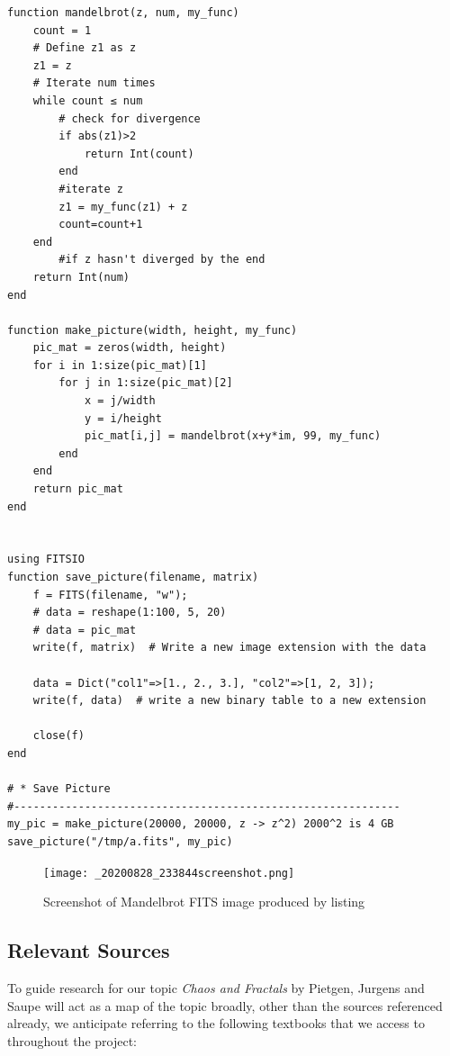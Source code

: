 \documentclass[11pt]{article}
\begin{document}
\lstset{language=julia,label,caption= ,captionpos=b,numbers=none}
\begin{lstlisting}
function mandelbrot(z, num, my_func)
    count = 1
    # Define z1 as z
    z1 = z
    # Iterate num times
    while count ≤ num
        # check for divergence
        if abs(z1)>2
            return Int(count)
        end
        #iterate z
        z1 = my_func(z1) + z
        count=count+1
    end
        #if z hasn't diverged by the end
    return Int(num)
end

function make_picture(width, height, my_func)
    pic_mat = zeros(width, height)
    for i in 1:size(pic_mat)[1]
        for j in 1:size(pic_mat)[2]
            x = j/width
            y = i/height
            pic_mat[i,j] = mandelbrot(x+y*im, 99, my_func)
        end
    end
    return pic_mat
end


using FITSIO
function save_picture(filename, matrix)
    f = FITS(filename, "w");
    # data = reshape(1:100, 5, 20)
    # data = pic_mat
    write(f, matrix)  # Write a new image extension with the data

    data = Dict("col1"=>[1., 2., 3.], "col2"=>[1, 2, 3]);
    write(f, data)  # write a new binary table to a new extension

    close(f)
end

# * Save Picture
#------------------------------------------------------------
my_pic = make_picture(20000, 20000, z -> z^2) 2000^2 is 4 GB
save_picture("/tmp/a.fits", my_pic)

\end{lstlisting}

\begin{figure}[htbp]
\centering
\texttt{[image: \_20200828\_233844screenshot.png]}
\caption{\label{mandelbrot-screen}Screenshot of Mandelbrot FITS image produced by listing }
\end{figure}
\subsection{Relevant Sources}
\label{sec:org8bae699}
To guide research for our topic \emph{Chaos and Fractals} by Pietgen, Jurgens and Saupe \cite{peitgenChaosFractalsNew2004} will act as a map of the topic broadly, other than the sources referenced already, we anticipate referring to the following textbooks that we access to throughout the project:
\end{document}
